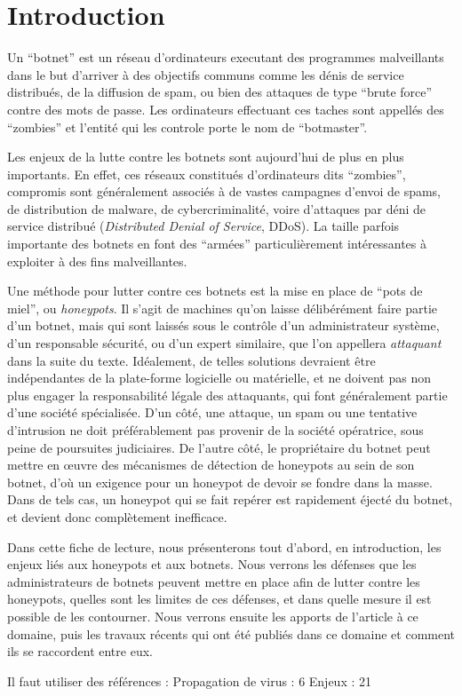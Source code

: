 \section*{Introduction}

Un ``botnet'' est un réseau d'ordinateurs executant des programmes malveillants
dans le but d'arriver à des objectifs communs comme les dénis de service distribués,
de la diffusion de spam, ou bien des attaques de type ``brute force'' contre
des mots de passe. Les ordinateurs effectuant ces taches sont appellés des ``zombies''
et l'entité qui les controle porte le nom de ``botmaster''.

Les enjeux de la lutte contre les botnets sont aujourd'hui de plus en plus
importants. En effet, ces réseaux constitués d'ordinateurs dits ``zombies'',
compromis sont généralement associés
à de vastes campagnes d'envoi de spams, de distribution de malware, de
cybercriminalité, voire d'attaques par déni de service distribué
(\textit{Distributed Denial of Service}, DDoS).  La taille parfois importante
des botnets en font des ``armées'' particulièrement intéressantes à exploiter à
des fins malveil\-lantes.

Une méthode pour lutter contre ces botnets est la mise en place de ``pots de
miel'', ou \textit{honeypots}.  Il s'agit de machines qu'on laisse délibérément
faire partie d'un botnet, mais qui sont laissés sous le contrôle d'un
administrateur système, d'un responsable sécurité, ou d'un expert similaire,
que l'on appellera \textit{attaquant} dans la suite du texte.  Idéalement, de
telles solutions devraient être indépendantes de la plate-forme logicielle ou
matérielle, et ne doivent pas non plus engager la responsabilité légale des
attaquants, qui font généralement partie d'une société spécialisée.  D'un côté,
une attaque, un spam ou une tentative d'intrusion ne doit préférablement pas
provenir de la société opératrice, sous peine de poursuites judiciaires. De
l'autre côté, le propriétaire du botnet peut mettre en œuvre des mécanismes de
détection de honeypots au sein de son botnet, d'où un exigence pour un honeypot
de devoir se fondre dans la masse.  Dans de tels cas, un honeypot qui se fait
repérer est rapidement éjecté du botnet, et devient donc complètement
inefficace.

Dans cette fiche de lecture, nous présenterons tout d'abord, en introduction,
les enjeux liés aux honeypots et aux botnets. Nous verrons les défenses que les
administrateurs de botnets peuvent mettre en place afin de lutter contre les
honeypots, quelles sont les limites de ces défenses, et dans quelle mesure il
est possible de les contourner. Nous verrons ensuite les apports de l'article à
ce domaine, puis les travaux récents qui ont été publiés dans ce domaine et
comment ils se raccordent entre eux.


Il faut utiliser des références :
Propagation de virus : 6
Enjeux : 21
